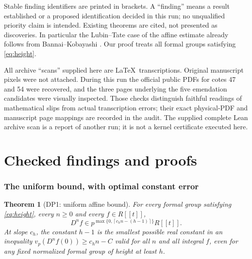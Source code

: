 \documentclass[11pt,a4paper]{article}
\newtheorem{theorem}{Theorem}[section]
\theoremstyle{definition}\newtheorem{remark}[theorem]{Remark}
\newcommand{\vp}{v_p}\newcommand{\dR}{\mathrm{dR}}\newcommand{\crys}{\mathrm{crys}}
\newcommand{\ceil}[1]{\left\lceil #1\right\rceil}\newcommand{\floor}[1]{\left\lfloor #1\right\rfloor}
\begin{document}
Stable finding identifiers are printed in brackets. A ``finding'' means a result established or a proposed identification decided in this run; no unqualified priority claim is intended. Existing theorems are cited, not presented as discoveries. In particular the Lubin--Tate case of the affine estimate already follows from Bannai--Kobayashi \cite[\S2, p.~527; Propositions 3.3 and 3.5, pp.~529, 531]{BK}. Our proof treats all formal groups satisfying \eqref{eq:height}.

All archive ``scans'' supplied here are \LaTeX\ transcriptions. Original manuscript pixels were not attached. During this run the official public PDFs for cotes 47 and 54 were recovered, and the three pages underlying the five emendation candidates were visually inspected. Those checks distinguish faithful readings of mathematical slips from actual transcription errors; their exact physical-PDF and manuscript page mappings are recorded in the audit. The supplied complete Lean archive scan is a report of another run; it is not a kernel certificate executed here.

\part{Checked findings and proofs}

\section{The uniform bound, with optimal constant error}

\begin{theorem}[DP1: uniform affine bound]\label{DP1}
For every formal group satisfying \eqref{eq:height}, every $n\ge0$ and every $f\in R[[t]]$,
\begin{equation}\label{eq:affine}
 D^n f\in p^{\max\{0,\ceil{c_hn-(h-1)}\}}R[[t]].
\end{equation}
At slope $c_h$, the constant $h-1$ is the smallest possible real constant in an inequality $\vp(D^nf(0))\ge c_hn-C$ valid for all $n$ and all integral $f$, even for any fixed normalized formal group of height at least $h$.
\end{theorem}
\end{document}

